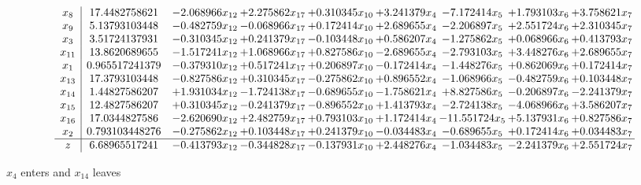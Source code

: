\documentclass[10pt]{article}
\begin{document}
 \[\begin{array}{c| c c@{\hskip 2pt} c@{\hskip 2pt} c@{\hskip 2pt} c@{\hskip 2pt} c@{\hskip 2pt} c@{\hskip 2pt} c@{\hskip 2pt} }
 x_{8}   &  17.4482758621 & -2.068966 x_{12} & + 2.275862 x_{17} & + 0.310345 x_{10} & + 3.241379 x_{4} & -7.172414 x_{5} & + 1.793103 x_{6} & + 3.758621 x_{7}\\
 x_{9}   &  5.13793103448 & -0.482759 x_{12} & -0.068966 x_{17} & + 0.172414 x_{10} & + 2.689655 x_{4} & -2.206897 x_{5} & + 2.551724 x_{6} & + 2.310345 x_{7}\\
 x_{3}   &  3.51724137931 & -0.310345 x_{12} & + 0.241379 x_{17} & -0.103448 x_{10} & + 0.586207 x_{4} & -1.275862 x_{5} & + 0.068966 x_{6} & + 0.413793 x_{7}\\
 x_{11}   &  13.8620689655 & -1.517241 x_{12} & + 1.068966 x_{17} & + 0.827586 x_{10} & -2.689655 x_{4} & -2.793103 x_{5} & + 3.448276 x_{6} & + 2.689655 x_{7}\\
 x_{1}   &  0.965517241379 & -0.379310 x_{12} & + 0.517241 x_{17} & + 0.206897 x_{10} & -0.172414 x_{4} & -1.448276 x_{5} & + 0.862069 x_{6} & + 0.172414 x_{7}\\
 x_{13}   &  17.3793103448 & -0.827586 x_{12} & + 0.310345 x_{17} & -0.275862 x_{10} & + 0.896552 x_{4} & -1.068966 x_{5} & -0.482759 x_{6} & + 0.103448 x_{7}\\
 x_{14}   &  1.44827586207 & + 1.931034 x_{12} & -1.724138 x_{17} & -0.689655 x_{10} & -1.758621 x_{4} & + 8.827586 x_{5} & -0.206897 x_{6} & -2.241379 x_{7}\\
 x_{15}   &  12.4827586207 & + 0.310345 x_{12} & -0.241379 x_{17} & -0.896552 x_{10} & + 1.413793 x_{4} & -2.724138 x_{5} & -4.068966 x_{6} & + 3.586207 x_{7}\\
 x_{16}   &  17.0344827586 & -2.620690 x_{12} & + 2.482759 x_{17} & + 0.793103 x_{10} & + 1.172414 x_{4} & -11.551724 x_{5} & + 5.137931 x_{6} & + 0.827586 x_{7}\\
 x_{2}   &  0.793103448276 & -0.275862 x_{12} & + 0.103448 x_{17} & + 0.241379 x_{10} & -0.034483 x_{4} & -0.689655 x_{5} & + 0.172414 x_{6} & + 0.034483 x_{7}\\
\hline
z    &  6.68965517241 & -0.413793 x_{12} & -0.344828 x_{17} & -0.137931 x_{10} & + 2.448276 x_{4} & -1.034483 x_{5} & -2.241379 x_{6} & + 2.551724 x_{7}\\
\end{array}\]


 $ x_{4} $ enters and $ x_{14} $ leaves 
\end{document}
